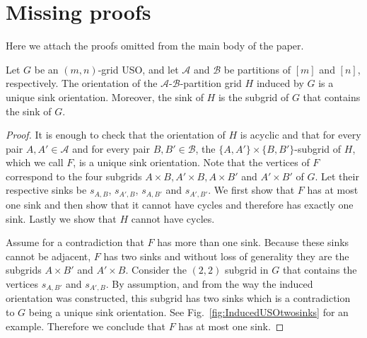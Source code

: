 \documentclass[runningheads,a4paper]{llncs}
\newcommand{\A}{\ensuremath{\mathcal A}}
\newcommand{\B}{\ensuremath{\mathcal B}}
\newcommand{\s}[1]{\ensuremath{s_{\scriptscriptstyle#1}}}
\begin{document}
\section{Missing proofs} \label{app:missingproofs}
Here we attach the proofs omitted from the main body of the paper. 

\setcounter{lemma}{0}
\begin{lemma}
Let $G$ be an $(m,n)$-grid USO,
and let $\A$ and $\B$ be partitions of $[m]$ and $[n]$, respectively.
The orientation of the $\A$-$\B$-partition grid $H$ induced by $G$ is a unique sink orientation.
Moreover, the sink of $H$ is the subgrid of $G$ that contains the sink of $G$.
\end{lemma}
\begin{proof}
It is enough to check that the orientation of $H$ is acyclic and that for every pair $A, A'\in \A$ and for every pair $B,B'\in \B$, the 
$\{A,A'\}\times\{B, B'\}$-subgrid of $H$, which we call $F$, is a unique sink orientation.
Note that the vertices of $F$ correspond to the four subgrids $A\times B, A'\times B, A\times B'$ and $A'\times B'$ of $G$. 
Let their respective sinks be $s_{A,B}$, $s_{A',B}$, $s_{A,B'}$ and $s_{A',B'}$.
We first show that $F$ has at most one sink and then show that it cannot have cycles and therefore has exactly one sink. Lastly we show that $H$ cannot have cycles.

Assume for a contradiction that $F$ has more than one sink.
Because these sinks cannot be adjacent, $F$ has two sinks and without loss of generality they are the subgrids $A\times B'$ and $A'\times B$. Consider the $(2,2)$ subgrid in $G$ that contains the vertices $\s{A,B'}$ and $\s{A',B}$. By assumption, and from the way the induced orientation was constructed, this subgrid has two sinks which is a contradiction to $G$ being a unique sink orientation. See Fig.~\ref{fig:InducedUSOtwosinks} for an example. Therefore we conclude that $F$ has at most one sink. 


\end{proof}
\end{document}
